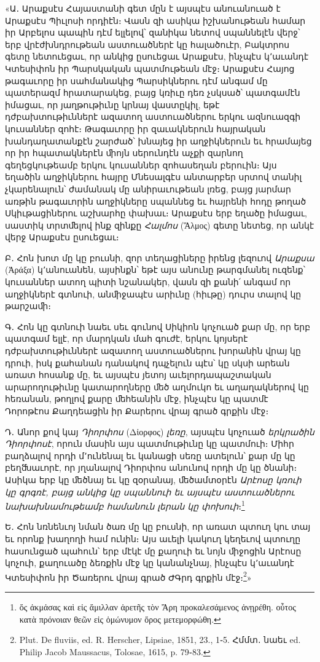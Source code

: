 \documentclass{article}
\begin{document}
{«Ա․ Արաքսէս Հայաստանի գետ մըն է այսպէս անուանուած է Արաքսէս Պիւլոսի որդիէն։ Վասն զի ասիկա իշխանութեան համար իր Արբելոս պապին դէմ ելլելով՝ զանիկա նետով սպաննելէն վերջ՝ երբ վրէժխնդրութեան աստուածներէ կը հալածուէր, Բակտրոս գետը նետուեցաւ, որ անկից ըսուեցաւ Արաքսէս, ինչպէս կ՚աւանդէ Կտեսիփոն իր Պարսկական պատմութեան մէջ։ Արաքսէս Հայոց թագաւորը իր սահմանակից Պարսիկներու դէմ անգամ մը պատերազմ հրատարակեց, բայց կռիւը դեռ չսկսած՝ պատգամէն իմացաւ, որ յաղթութիւնը կրնայ վաստըկիլ, եթէ դժբախտութիւններէ ազատող աստուածներու երկու ազնուազգի կուսաններ զոհէ։ Թագաւորը իր զաւակներուն հայրական խանդաղատանքէն շարժած՝ խնայեց իր աղջիկներուն եւ հրամայեց որ իր հպատակներէն ﬕոյն սերունդէն աչքի զարնող գեղեցկութեամբ երկու կուսաններ զոհասեղան բերուին։ Այս եղածին աղջիկներու հայրը Մնեսալգէս անտարբեր սրտով տանիլ չկարենալուն՝ ժամանակ մը անիրաւութեան լռեց, բայց յարմար առթին թագաւորին աղջիկները սպաննեց եւ հայրենի հոդը թողած Սկիւթացիներու աշխարհը փախաւ։ Արաքսէս երբ եղածը իմացաւ, սաստիկ տրտﬔլով ինք զինքը \emph{Հալմոս} (Ἅλμος) գետը նետեց, որ անկէ վերջ Արաքսէս ըսուեցաւ։

Բ․ Հոն խոտ մը կը բուսնի, զոր տեղացիները իրենց լեզուով \emph{Արաքսա} (Ἀράξα) կ՚անուանեն, այսինքն՝ եթէ այս անունը թարգմանել ուզենք՝ կուսաններ ատող պիտի նշանակեր, վասն զի քանի՛ անգամ որ աղջիկներէ գտնուի, անﬕջապէս արիւնը (հիւթը) դուրս տալով կը թարշաﬕ։

Գ․ Հոն կը գտնուի նաեւ սեւ գունով Սիկիոն կոչուած քար մը, որ երբ պատգամ ելլէ, որ մարդկան մահ գուժէ, երկու կոյսերէ դժբախտութիւններէ ազատող աստուածներու խորանին վրայ կը դրուի, իսկ քահանան դանակով դպչելուն պէս՝ կը սկսի արեան առատ հոսանք մը, եւ այսպէս յետոյ աւելորդապաշտական արարողութիւնը կատարողները ﬔծ աղմուկո եւ աղաղակներով կը հեռանան, թողլով քարը ﬔհեանին մէջ, ինչպէս կը պատմէ Դորոթէոս Քաղդեացին իր Քարերու վրայ գրած գրքին մէջ։

Դ․ Անոր քով կայ \emph{Դիորփոս} (Δἰορφος) \emph{լեռը}, այսպէս կոչուած \emph{երկրածին Դիորփոսէ}, որուն մասին այս պատմութիւնը կը պատմուի։ Միհր բաղձալով որդի մ՚ունենալ եւ կանացի սեռը ատելուն՝ քար մը կը բեղﬓաւորէ, որ յղանալով Դիորփոս անունով որդի մը կը ծնանի։ Ասիկա երբ կը ﬔծնայ եւ կը զօրանայ, ﬔծամտօրէն \emph{Արէոսը կռուի կը գրգռէ, բայց անկից կը սպաննուի եւ այսպէս աստուածներու նախախնամութեամբ համանուն լերան կը փոխուի}։\footnote{ὅς ἀκμἀσας καὶ εἰς ἅμιλλαν ἀρετῆς τὸν Ἄρη προκαλεσάμενος ἀνῃρέθη. οὗτος κατὰ πρόνοιαν θεῶν εἰς ὁμώνυμον ὄρος μετεμορφώθη.}

Ե․ Հոն նռնենւոյ նման ծառ մը կը բուսնի, որ առատ պտուղ կու տայ եւ որոնք խաղողի համ ունին։ Այս աւելի կակուղ կեղեւով պտուղը հասունցած պահուն՝ երբ մէկէ մը քաղուի եւ նոյն ﬕջոցին Արէոսը կոչուի, քաղուածը ձեռքին մէջ կը կանանչնայ, ինչպէս կ՚աւանդէ Կտեսիփոն իր Ծառերու վրայ գրած ԺԳրդ գրքին մէջ։\footnote{Plut. De fluviis, ed. R. Herscher, Lipsiae, 1851, 23., 1֊5. Հմմտ․ նաեւ ed. Philip Jacob Maussacus, Tolosae, 1615, p. 79֊83.}»

}
\end{document}
